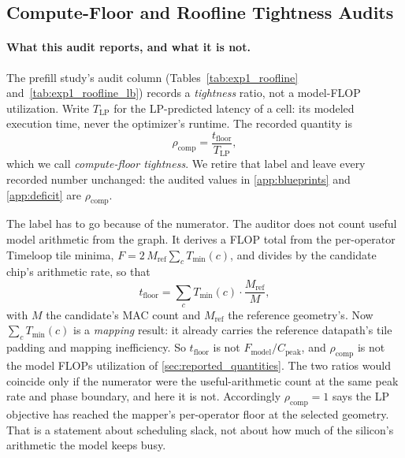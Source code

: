 \subsection{Compute-Floor and Roofline Tightness Audits}
\label{app:mfu}
\paragraph{What this audit reports, and what it is not.}
The prefill study's audit column (Tables~\ref{tab:exp1_roofline} and~\ref{tab:exp1_roofline_lb}) records a \emph{tightness} ratio, not a model-FLOP utilization.
Write $T_{\mathrm{LP}}$ for the LP-predicted latency of a cell: its modeled execution time, never the optimizer's runtime.
The recorded quantity is
\begin{equation}
    \rho_{\mathrm{comp}}
    = \frac{t_{\mathrm{floor}}}{T_{\mathrm{LP}}},
    \label{eq:mfu_audit}
\end{equation}
which we call \emph{compute-floor tightness}.
We retire that label and leave every recorded number unchanged: the audited values in \cref{app:blueprints} and \cref{app:deficit} are $\rho_{\mathrm{comp}}$.

The label has to go because of the numerator.
The auditor does not count useful model arithmetic from the graph.
It derives a FLOP total from the per-operator Timeloop tile minima, $F = 2\,M_{\mathrm{ref}}\sum_c T_{\min}(c)$, and divides by the candidate chip's arithmetic rate, so that
\begin{equation}
    t_{\mathrm{floor}}
    = \sum_c T_{\min}(c)\cdot\frac{M_{\mathrm{ref}}}{M},
    \label{eq:floor_construction}
\end{equation}
with $M$ the candidate's MAC count and $M_{\mathrm{ref}}$ the reference geometry's.
Now $\sum_c T_{\min}(c)$ is a \emph{mapping} result: it already carries the reference datapath's tile padding and mapping inefficiency.
So $t_{\mathrm{floor}}$ is not $F_{\mathrm{model}}/C_{\mathrm{peak}}$, and $\rho_{\mathrm{comp}}$ is not the model FLOPs utilization of \cref{sec:reported_quantities}.
The two ratios would coincide only if the numerator were the useful-arithmetic count at the same peak rate and phase boundary, and here it is not.
Accordingly $\rho_{\mathrm{comp}} = 1$ says the LP objective has reached the mapper's per-operator floor at the selected geometry.
That is a statement about scheduling slack, not about how much of the silicon's arithmetic the model keeps busy.

